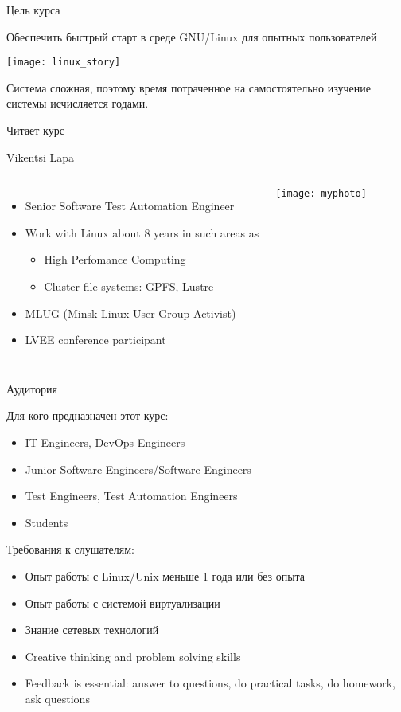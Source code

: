 \begin{frame}{Цель курса}
	\begin{center}
		\large
		Обеспечить быстрый старт в среде GNU/Linux для опытных пользователей
	\end{center} 
    \pause
         \center\texttt{[image: linux\_story]} 

    Система сложная, поэтому время потраченное на самостоятельно изучение системы исчисляется годами.
\end{frame}

\begin{frame}{Читает курс}

    \large Vikentsi Lapa 
    \begin{columns}
            \begin{itemize}
                \item Senior Software Test Automation Engineer
                \item Work with Linux about 8 years in such areas as
                \begin{itemize}
                    \item High Perfomance Computing
                    \item Cluster file systems: GPFS, Lustre 
                \end{itemize}
                \item MLUG (Minsk Linux User Group Activist)
                \item LVEE conference participant 
            \end{itemize}
            \center\texttt{[image: myphoto]}
    \end{columns}
\end{frame}

\begin{frame}{Аудитория}

Для кого предназначен этот курс:
\begin{itemize}
    \item IT Engineers, DevOps Engineers
    \item Junior Software Engineers/Software Engineers
    \item Test Engineers, Test Automation Engineers
    \item Students
\end{itemize}
    \pause
Требования к слушателям:
\begin{itemize}
    \item Опыт работы с Linux/Unix меньше 1 года или без опыта
    \pause
    \item Опыт работы с системой виртуализации
    \pause
    \item Знание сетевых технологий
    \pause
    \item Creative thinking and problem solving skills
    \pause
    \item \alert{Feedback is essential: answer to questions, do practical tasks, do homework, ask questions}
\end{itemize}
\end{frame}

